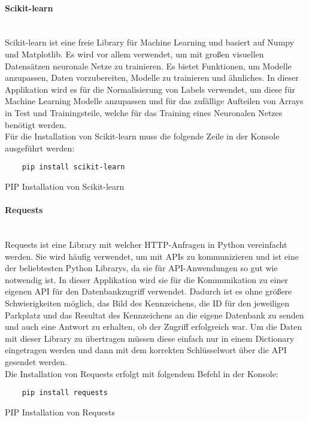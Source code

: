 \paragraph{Scikit-learn}\mbox{}\\
Scikit-learn ist eine freie Library für Machine Learning und basiert auf Numpy und Matplotlib. Es wird vor allem verwendet, 
um mit großen visuellen Datensätzen neuronale Netze zu trainieren.  Es bietet Funktionen, um Modelle anzupassen, Daten vorzubereiten, 
Modelle zu trainieren und ähnliches. In dieser Applikation wird es für die Normalisierung von Labels verwendet, um diese für Machine 
Learning Modelle anzupassen und für das zufällige Aufteilen von Arrays in Test und Trainingsteile, welche für das Training eines Neuronalen Netzes benötigt werden.\\

Für die Installation von Scikit-learn muss die folgende Zeile in der Konsole ausgeführt werden:

\begin{listing}[H]
    \begin{verbatim}
    pip install scikit-learn
    \end{verbatim}
    \caption{PIP Installation von Scikit-learn}
\end{listing}

\paragraph{Requests}\mbox{}\\
Requests ist eine Library mit welcher HTTP-Anfragen in Python vereinfacht werden. Sie wird häufig verwendet, um mit APIs zu kommunizieren 
und ist eine der beliebtesten Python Librarys, da sie für API-Anwendungen so gut wie notwendig ist. In dieser Applikation wird sie für die 
Kommunikation zu einer eigenen API für den Datenbankzugriff verwendet. Dadurch ist es ohne größere Schwierigkeiten möglich, das Bild des Kennzeichens, 
die ID für den jeweiligen Parkplatz und das Resultat des Kennzeichens an die eigene Datenbank zu senden und auch eine Antwort zu erhalten, ob der 
Zugriff erfolgreich war. Um die Daten mit dieser Library zu übertragen müssen diese einfach nur in einem Dictionary eingetragen werden und dann mit 
dem korrekten Schlüsselwort über die API gesendet werden.\\

Die Installation von Requests erfolgt mit folgendem Befehl in der Konsole:

\begin{listing}[H]
    \begin{verbatim}
    pip install requests
    \end{verbatim}
    \caption{PIP Installation von Requests}
\end{listing}

